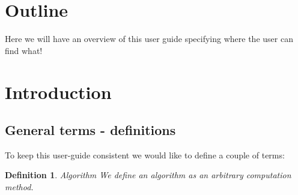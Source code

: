 \documentclass[twoside,a4paper]{refart}
\theoremstyle{dotless}
\newtheorem{definition}{Definition}[section]
\newcounter{ex}
\begin{document}

	

\section{Outline}
\label{outline}
Here we will have an overview of this user guide specifying where the user can find what!

\section{Introduction}

\subsection{General terms - definitions}
To keep this user-guide consistent we would like to define a couple of terms:
\begin{definition}{Algorithm}
	We define an algorithm as an arbitrary computation method. 
\end{definition}
\end{document}
